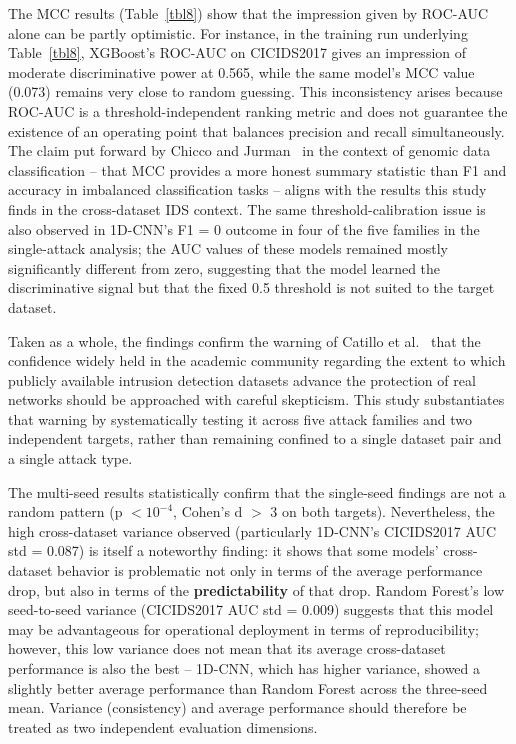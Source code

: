 \documentclass[a4paper,fleqn]{cas-sc}
\begin{document}
The MCC results (Table~\ref{tbl8}) show that the impression given by ROC-AUC alone can be partly optimistic. For instance, in the training run underlying Table~\ref{tbl8}, XGBoost's ROC-AUC on CICIDS2017 gives an impression of moderate discriminative power at 0.565, while the same model's MCC value (0.073) remains very close to random guessing. This inconsistency arises because ROC-AUC is a threshold-independent ranking metric and does not guarantee the existence of an operating point that balances precision and recall simultaneously. The claim put forward by Chicco and Jurman~\cite{ChiccoJurman2020} in the context of genomic data classification -- that MCC provides a more honest summary statistic than F1 and accuracy in imbalanced classification tasks -- aligns with the results this study finds in the cross-dataset IDS context. The same threshold-calibration issue is also observed in 1D-CNN's F1 = 0 outcome in four of the five families in the single-attack analysis; the AUC values of these models remained mostly significantly different from zero, suggesting that the model learned the discriminative signal but that the fixed 0.5 threshold is not suited to the target dataset.

Taken as a whole, the findings confirm the warning of Catillo et al.~\cite{Catillo2023} that the confidence widely held in the academic community regarding the extent to which publicly available intrusion detection datasets advance the protection of real networks should be approached with careful skepticism. This study substantiates that warning by systematically testing it across five attack families and two independent targets, rather than remaining confined to a single dataset pair and a single attack type.

The multi-seed results statistically confirm that the single-seed findings are not a random pattern (p $< 10^{-4}$, Cohen's d $>$ 3 on both targets). Nevertheless, the high cross-dataset variance observed (particularly 1D-CNN's CICIDS2017 AUC std = 0.087) is itself a noteworthy finding: it shows that some models' cross-dataset behavior is problematic not only in terms of the average performance drop, but also in terms of the \textbf{predictability} of that drop. Random Forest's low seed-to-seed variance (CICIDS2017 AUC std = 0.009) suggests that this model may be advantageous for operational deployment in terms of reproducibility; however, this low variance does not mean that its average cross-dataset performance is also the best -- 1D-CNN, which has higher variance, showed a slightly better average performance than Random Forest across the three-seed mean. Variance (consistency) and average performance should therefore be treated as two independent evaluation dimensions.
\end{document}
